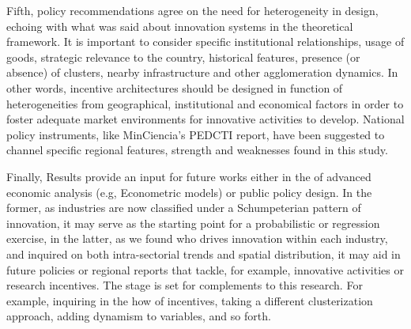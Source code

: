 \documentclass[12pt,a4paper]{article}
\begin{document}
Fifth, policy recommendations agree on the need for heterogeneity in design, echoing with what was said about innovation systems in the theoretical framework. It is important to consider specific institutional relationships, usage of goods, strategic relevance to the country, historical features, presence (or absence) of clusters, nearby infrastructure and other agglomeration dynamics. In other words, incentive architectures should be designed in function of heterogeneities from geographical, institutional and economical factors in order to foster adequate market environments for innovative activities to develop. National policy instruments, like MinCiencia's PEDCTI report, have been suggested to channel specific regional features, strength and weaknesses found in this study. 

Finally, Results provide an input for future works either in the of advanced economic analysis (e.g, Econometric models) or public policy design. In the former, as industries are now classified under a Schumpeterian pattern of innovation, it may serve as the starting point for a probabilistic or regression exercise, in the latter, as we found who drives innovation within each industry, and inquired on both intra-sectorial trends and spatial distribution, it may aid in future policies or regional reports that tackle, for example, innovative activities or research incentives. The stage is set for complements to this research. For example, inquiring in the how of incentives, taking a different clusterization approach, adding dynamism to variables, and so forth. 


\pagebreak
\end{document}
